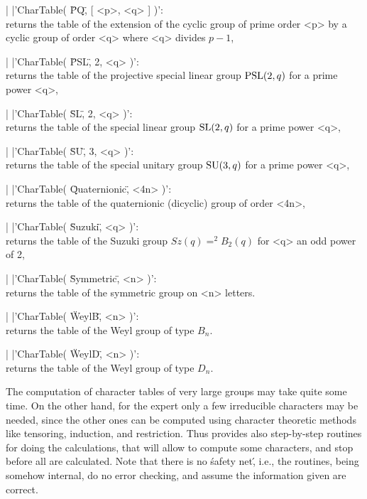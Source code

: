 |    |'CharTable( \"P\:Q\", [ <p>, <q> ] )':\\
    returns the table of the extension of the cyclic group of prime order
    <p> by a cyclic group of order <q> where <q> divides $p-1$,

|    |'CharTable( \"PSL\", 2, <q> )':\\
    returns the table of the projective special linear group
    $\mbox{\rm PSL}(2,q)$ for a prime power <q>,

|    |'CharTable( \"SL\", 2, <q> )':\\
    returns the table of the special linear group $\mbox{\rm SL}(2,q)$
    for a prime power <q>,

|    |'CharTable( \"SU\", 3, <q> )':\\
    returns the table of the special unitary group $\mbox{\rm SU}(3,q)$
    for a prime power <q>,

|    |'CharTable( \"Quaternionic\", <4n> )':\\
    returns the table of the quaternionic (dicyclic) group of order <4n>,

|    |'CharTable( \"Suzuki\", <q> )':\\
    returns the table of the Suzuki group $Sz(q) = ^2B_2(q)$ for <q> an
    odd power of 2,

|    |'CharTable( \"Symmetric\", <n> )':\\
    returns the table of the symmetric group on <n> letters.

|    |'CharTable( \"WeylB\", <n> )':\\
    returns the table of the Weyl group of type $B_n$.

|    |'CharTable( \"WeylD\", <n> )':\\
    returns the table of the Weyl  group of type $D_n$.


%

The computation of character tables  of very large  groups may take quite
some time.  On the other hand, for  the  expert  only a  few  irreducible
characters may  be needed, since the other  ones can  be  computed  using
character  theoretic  methods like tensoring, induction, and restriction.
Thus   {\GAP}  provides   also  step-by-step   routines  for   doing  the
calculations, that will allow to compute some characters, and stop before
all  are calculated.  Note  that there is no  \'safety net\',  i.e.,  the
routines, being  somehow internal, do no error  checking,  and assume the
information given are correct.

